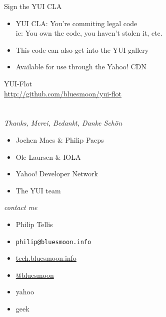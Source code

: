 \documentclass{beamer}
\begin{document}
\begin{frame}{Sign the YUI CLA}
  \begin{itemize}
  \item YUI CLA: You're commiting legal code \\ \footnotesize{ie: You own the code, you haven't stolen it, etc.}
  \item This code can also get into the YUI gallery
  \item Available for use through the Yahoo! CDN
  \end{itemize}
\end{frame}

\begin{frame}{}
  \begin{block}{}
    \begin{center}
    YUI-Flot \\
    \href{http://github.com/bluesmoon/yui-flot/}{http://github.com/bluesmoon/yui-flot}
    \end{center}
  \end{block}
\end{frame}

\section{}
\begin{frame}{\textit{Thanks, Merci, Bedankt, Danke Sch\"on}}
  \begin{itemize}
  \item Jochen Maes \& Philip Paeps
  \item Ole Laursen \& IOLA
  \item Yahoo! Developer Network
  \item The YUI team
  \end{itemize}
\end{frame}

\begin{frame}{\textit{contact me}}
  \begin{itemize}
  \item Philip Tellis
  \item \small{\texttt{philip@bluesmoon.info}}
  \item \href{http://tech.bluesmoon.info/}{tech.bluesmoon.info}
  \item \href{http://twitter.com/bluesmoon}{@bluesmoon}
  \item yahoo
  \item geek
  \end{itemize}
\end{frame}
\end{document}
